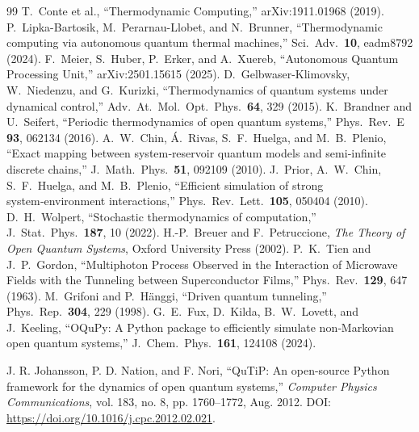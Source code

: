 \documentclass[11pt,a4paper]{article}
\theoremstyle{definition}
\theoremstyle{remark}
\begin{document}
\begin{thebibliography}{99}
 T.~Conte et al., “Thermodynamic Computing,” arXiv:1911.01968 (2019).
 P.~Lipka-Bartosik, M.~Perarnau-Llobet, and N.~Brunner, “Thermodynamic computing via autonomous quantum thermal machines,” Sci.\ Adv.\ \textbf{10}, eadm8792 (2024).
 F.~Meier, S.~Huber, P.~Erker, and A.~Xuereb, “Autonomous Quantum Processing Unit,” arXiv:2501.15615 (2025).
 D.~Gelbwaser-Klimovsky, W.~Niedenzu, and G.~Kurizki, “Thermodynamics of quantum systems under dynamical control,” Adv.\ At.\ Mol.\ Opt.\ Phys.\ \textbf{64}, 329 (2015).
 K.~Brandner and U.~Seifert, “Periodic thermodynamics of open quantum systems,” Phys.\ Rev.\ E \textbf{93}, 062134 (2016).
 A.~W.~Chin, \'{A}.~Rivas, S.~F.~Huelga, and M.~B.~Plenio, “Exact mapping between system‑reservoir quantum models and semi‑infinite discrete chains,” J.\ Math.\ Phys.\ \textbf{51}, 092109 (2010).
 J.~Prior, A.~W.~Chin, S.~F.~Huelga, and M.~B.~Plenio, “Efficient simulation of strong system‑environment interactions,” Phys.\ Rev.\ Lett.\ \textbf{105}, 050404 (2010).
 D.~H.~Wolpert, “Stochastic thermodynamics of computation,” J.\ Stat.\ Phys.\ \textbf{187}, 10 (2022).
 H.-P.~Breuer and F.~Petruccione, \textit{The Theory of Open Quantum Systems}, Oxford University Press (2002).
 P.~K.~Tien and J.~P.~Gordon, ``Multiphoton Process Observed in the Interaction of Microwave Fields with the Tunneling between Superconductor Films,'' Phys.\ Rev.\ \textbf{129}, 647 (1963).
 M.~Grifoni and P.~H\"anggi, ``Driven quantum tunneling,'' Phys.\ Rep.\ \textbf{304}, 229 (1998).
 G.~E.~Fux, D.~Kilda, B.~W.~Lovett, and J.~Keeling, “OQuPy: A Python package to efficiently simulate non‑Markovian open quantum systems,” J.\ Chem.\ Phys.\ \textbf{161}, 124108 (2024).

J. R. Johansson, P. D. Nation, and F. Nori,
``QuTiP: An open-source Python framework for the dynamics of open quantum systems,''
\textit{Computer Physics Communications},
vol. 183, no. 8, pp. 1760--1772, Aug. 2012.
DOI: \url{https://doi.org/10.1016/j.cpc.2012.02.021}.

\end{thebibliography}
\end{document}
